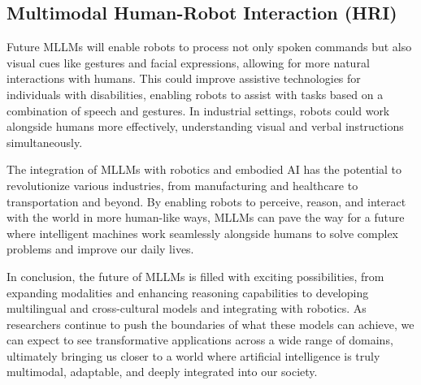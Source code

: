 \subsection{Multimodal Human-Robot Interaction (HRI)}

Future MLLMs will enable robots to process not only spoken commands but also visual cues like gestures and facial expressions, allowing for more natural interactions with humans. This could improve assistive technologies for individuals with disabilities, enabling robots to assist with tasks based on a combination of speech and gestures. In industrial settings, robots could work alongside humans more effectively, understanding visual and verbal instructions simultaneously.

The integration of MLLMs with robotics and embodied AI has the potential to revolutionize various industries, from manufacturing and healthcare to transportation and beyond. By enabling robots to perceive, reason, and interact with the world in more human-like ways, MLLMs can pave the way for a future where intelligent machines work seamlessly alongside humans to solve complex problems and improve our daily lives.

In conclusion, the future of MLLMs is filled with exciting possibilities, from expanding modalities and enhancing reasoning capabilities to developing multilingual and cross-cultural models and integrating with robotics. As researchers continue to push the boundaries of what these models can achieve, we can expect to see transformative applications across a wide range of domains, ultimately bringing us closer to a world where artificial intelligence is truly multimodal, adaptable, and deeply integrated into our society.
